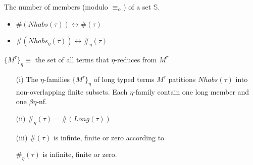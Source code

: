 \begin{frame}
 
 \begin{mydef}
 The number of members (modulo $\equiv_{\alpha}$) of a set $\mathbb{S}$.
 \begin{itemize}
  \item $\#(Nhabs(\tau))  \longleftrightarrow  \#(\tau)$
  \item $\#(Nhabs_{\eta}(\tau)) \longleftrightarrow \#_{\eta}(\tau)$
 \end{itemize}
\end{mydef}
 
 \begin{notation}
  $\{M^{\tau}\}_\eta \equiv$ the set of all terms that $\eta$-reduces from $M^{\tau}$ 
  \end{notation}

\begin{lem}\label{8A10}

    \begin{itemize}


           \item[(i)] The $\eta$-families  $\{M^{\tau}\}_\eta$ of long typed terms $M^{\tau}$ 
             patitions $Nhabs(\tau)$ into non-overlapping finite subsets. Each $\eta$-family contain one long
             member and one $\beta \eta$-nf.

        \item[(ii)] $\#_{\eta}(\tau) = \#(Long(\tau))$
        
        \item[(iii)] $\#(\tau)$ is infinte, finite or zero according to 
         
         $\#_\eta(\tau)$ is infinite, finite or zero.

      \end{itemize}
\end{lem}

\end{frame}

